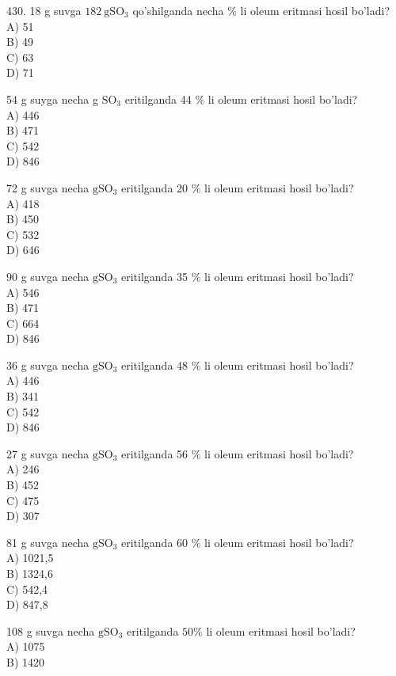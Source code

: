 430. 18 g suvga $182 \mathrm{~g} \mathrm{SO}_{3}$ qo'shilganda necha \% li oleum eritmasi hosil bo'ladi?\\
A) 51\\
B) 49\\
C) 63\\
D) 71
  \item 54 g suyga necha g $\mathrm{SO}_{3}$ eritilganda 44 $\%$ li oleum eritmasi hosil bo'ladi?\\
A) 446\\
B) 471\\
C) 542\\
D) 846
  \item 72 g suvga necha $\mathrm{g} \mathrm{SO}_{3}$ eritilganda 20 $\%$ li oleum eritmasi hosil bo'ladi?\\
A) 418\\
B) 450\\
C) 532\\
D) 646
  \item 90 g suvga necha $\mathrm{g} \mathrm{SO}_{3}$ eritilganda 35 $\%$ li oleum eritmasi hosil bo'ladi?\\
A) 546\\
B) 471\\
C) 664\\
D) 846
  \item 36 g suvga necha $\mathrm{g} \mathrm{SO}_{3}$ eritilganda 48 $\%$ li oleum eritmasi hosil bo'ladi?\\
A) 446\\
B) 341\\
C) 542\\
D) 846
  \item 27 g suvga necha $\mathrm{g} \mathrm{SO}_{3}$ eritilganda 56 \% li oleum eritmasi hosil bo'ladi?\\
A) 246\\
B) 452\\
C) 475\\
D) 307
  \item 81 g suvga necha $\mathrm{g} \mathrm{SO}_{3}$ eritilganda 60 $\%$ li oleum eritmasi hosil bo'ladi?\\
A) 1021,5\\
B) 1324,6\\
C) 542,4\\
D) 847,8
  \item 108 g suvga necha $\mathrm{g} \mathrm{SO}_{3}$ eritilganda $50 \%$ li oleum eritmasi hosil bo'ladi?\\
A) 1075\\
B) 1420\\
